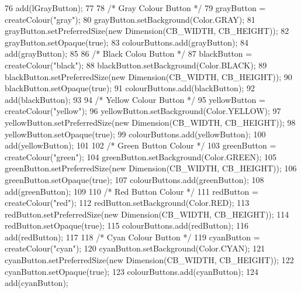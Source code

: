 \begin{DoxyCode}
76         add(lGrayButton);
77         
78         \textcolor{comment}{/* Gray Colour Button */}
79         grayButton = createColour(\textcolor{stringliteral}{"gray"});
80         grayButton.setBackground(Color.GRAY);
81         grayButton.setPreferredSize(\textcolor{keyword}{new} Dimension(CB\_WIDTH, CB\_HEIGHT));
82         grayButton.setOpaque(\textcolor{keyword}{true});
83         colourButtons.add(grayButton);
84         add(grayButton);
85         
86         \textcolor{comment}{/* Black Colou Button */}
87         blackButton = createColour(\textcolor{stringliteral}{"black"});
88         blackButton.setBackground(Color.BLACK);
89         blackButton.setPreferredSize(\textcolor{keyword}{new} Dimension(CB\_WIDTH, CB\_HEIGHT));
90         blackButton.setOpaque(\textcolor{keyword}{true});
91         colourButtons.add(blackButton);
92         add(blackButton);       
93         
94         \textcolor{comment}{/* Yellow Colour Button */}
95         yellowButton = createColour(\textcolor{stringliteral}{"yellow"});
96         yellowButton.setBackground(Color.YELLOW);
97         yellowButton.setPreferredSize(\textcolor{keyword}{new} Dimension(CB\_WIDTH, CB\_HEIGHT));
98         yellowButton.setOpaque(\textcolor{keyword}{true});
99         colourButtons.add(yellowButton);
100         add(yellowButton);
101         
102         \textcolor{comment}{/* Green Button Colour */}
103         greenButton = createColour(\textcolor{stringliteral}{"green"});
104         greenButton.setBackground(Color.GREEN);
105         greenButton.setPreferredSize(\textcolor{keyword}{new} Dimension(CB\_WIDTH, CB\_HEIGHT));
106         greenButton.setOpaque(\textcolor{keyword}{true});
107         colourButtons.add(greenButton);
108         add(greenButton);
109         
110         \textcolor{comment}{/* Red Button Colour */}
111         redButton = createColour(\textcolor{stringliteral}{"red"});
112         redButton.setBackground(Color.RED);
113         redButton.setPreferredSize(\textcolor{keyword}{new} Dimension(CB\_WIDTH, CB\_HEIGHT));
114         redButton.setOpaque(\textcolor{keyword}{true});
115         colourButtons.add(redButton);
116         add(redButton);
117         
118         \textcolor{comment}{/* Cyan Colour Button */}
119         cyanButton = createColour(\textcolor{stringliteral}{"cyan"});
120         cyanButton.setBackground(Color.CYAN);
121         cyanButton.setPreferredSize(\textcolor{keyword}{new} Dimension(CB\_WIDTH, CB\_HEIGHT));
122         cyanButton.setOpaque(\textcolor{keyword}{true});
123         colourButtons.add(cyanButton);
124         add(cyanButton);

\end{DoxyCode}

